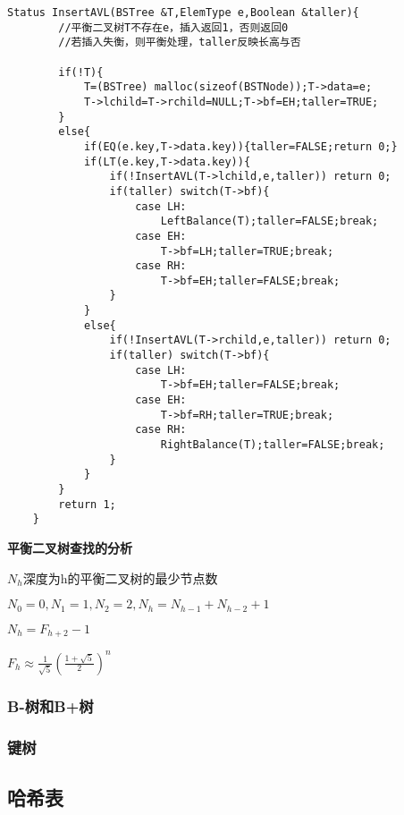 \documentclass[UTF8]{ctexart}
\newcommand{\mb}[1]{\textbf{#1}}
\newcommand{\mf}[1]{\left( #1\right)}
\newcommand{\p}{\par}
\begin{document}
\begin{lstlisting}[style=v1]
    Status InsertAVL(BSTree &T,ElemType e,Boolean &taller){
        //平衡二叉树T不存在e，插入返回1，否则返回0
        //若插入失衡，则平衡处理，taller反映长高与否

        if(!T){
            T=(BSTree) malloc(sizeof(BSTNode));T->data=e;
            T->lchild=T->rchild=NULL;T->bf=EH;taller=TRUE;
        }
        else{
            if(EQ(e.key,T->data.key)){taller=FALSE;return 0;}
            if(LT(e.key,T->data.key)){
                if(!InsertAVL(T->lchild,e,taller)) return 0;
                if(taller) switch(T->bf){
                    case LH:
                        LeftBalance(T);taller=FALSE;break;
                    case EH:
                        T->bf=LH;taller=TRUE;break;
                    case RH:
                        T->bf=EH;taller=FALSE;break;
                }
            }
            else{
                if(!InsertAVL(T->rchild,e,taller)) return 0;
                if(taller) switch(T->bf){
                    case LH:
                        T->bf=EH;taller=FALSE;break;
                    case EH:
                        T->bf=RH;taller=TRUE;break;
                    case RH:
                        RightBalance(T);taller=FALSE;break;
                }
            }
        }
        return 1;
    }
\end{lstlisting}





\mb{平衡二叉树查找的分析}\p
$N_h$深度为h的平衡二叉树的最少节点数

$N_0=0,N_1=1,N_2=2,N_h=N_{h-1}+N_{h-2}+1$

$N_h=F_{h+2}-1$

$F_h \approx \frac{1}{\sqrt{5}}\mf{\frac{1+\sqrt{5}}{2}}^n$



\subsubsection{B-树和B+树}
\subsubsection{键树}






\subsection{哈希表}
\end{document}
